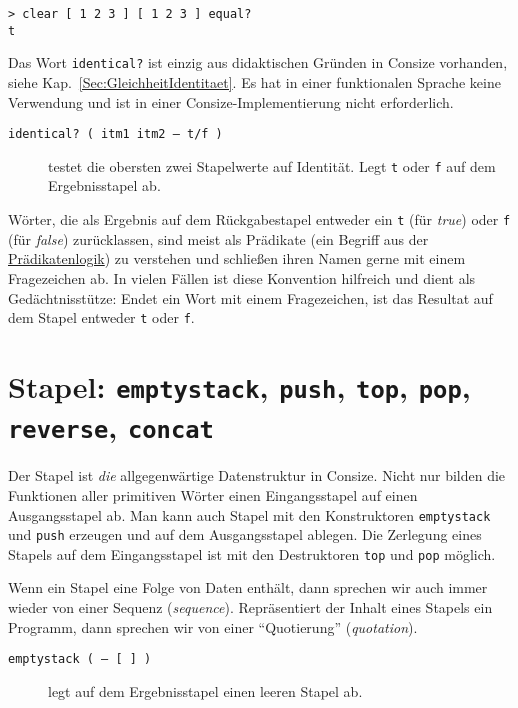 \begin{verbatim}
> clear [ 1 2 3 ] [ 1 2 3 ] equal?
t
\end{verbatim}

Das Wort \verb|identical?| ist einzig aus didaktischen Gründen in Consize vorhanden, siehe Kap.~\ref{Sec:GleichheitIdentitaet}. Es hat in einer funktionalen Sprache keine Verwendung und ist in einer Consize-Implementierung nicht erforderlich.

\begin{description}
\item[\texttt{identical? ( itm1 itm2 -- t/f )}] testet die obersten zwei Stapelwerte auf Identität. Legt \verb|t| oder \verb|f| auf dem Ergebnisstapel ab.
\end{description}

Wörter, die als Ergebnis auf dem Rückgabestapel entweder ein \verb|t| (für \emph{true}) oder \verb|f| (für \emph{false}) zurücklassen, sind meist als Prädikate (ein Begriff aus der \href{http://de.wikipedia.org/wiki/Pr\%C3\%A4dikatenlogik}{Prädikatenlogik}) zu verstehen und schließen ihren Namen gerne mit einem Fragezeichen ab. In vielen Fällen ist diese Konvention hilfreich und dient als Gedächtnisstütze: Endet ein Wort mit einem Fragezeichen, ist das Resultat auf dem Stapel entweder \verb|t| oder \verb|f|.

\section{Stapel: \texttt{emptystack}, \texttt{push}, \texttt{top}, \texttt{pop}, \texttt{reverse}, \texttt{concat}}
\label{sec:core.stacks}

Der Stapel ist \emph{die} allgegenwärtige Datenstruktur in Consize.
Nicht nur bilden die Funktionen aller primitiven Wörter einen Eingangsstapel auf einen Ausgangsstapel ab. Man kann auch Stapel mit den Konstruktoren \verb|emptystack| und \verb|push| erzeugen und auf dem Ausgangsstapel ablegen. Die Zerlegung eines Stapels auf dem Eingangsstapel ist mit den Destruktoren \verb|top| und \verb|pop| möglich.

Wenn ein Stapel eine Folge von Daten enthält, dann sprechen wir auch immer wieder von einer Sequenz (\emph{sequence}). Repräsentiert der Inhalt eines Stapels ein Programm, dann sprechen wir von einer "`Quotierung"' (\emph{quotation}).

\begin{description}
\item[\texttt{emptystack ( -- [ ] )}] legt auf dem Ergebnisstapel einen leeren Stapel ab.
\end{description}

